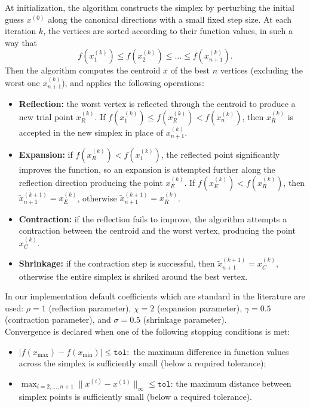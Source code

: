\documentclass[a4paper,12pt]{article}
\begin{document}
	At initialization, the algorithm constructs the simplex by perturbing the initial guess \( x^{(0)} \) along the canonical directions with a small fixed step size. At each iteration $k$, the vertices are sorted according to their function values, in such a way that
	\[
	f(x^{(k)}_{1})\leq f(x^{(k)}_{2})\leq\dots\leq f(x^{(k)}_{n+1}).
	\]
	Then the algorithm computes the centroid \( \bar{x} \) of the best \( n \) vertices (excluding the worst one $x^{(k)}_{n+1}$), and applies the following operations:
	\begin{itemize}
		\item \textbf{Reflection:} the worst vertex is reflected through the centroid to produce a new trial point $x^{(k)}_{R}$. If $f(x^{(k)}_{1})\leq f(x^{(k)}_{R})<f(x^{(k)}_{n})$, then $x^{(k)}_{R}$ is accepted in the new simplex in place of $x^{(k)}_{n+1}$.
		\item \textbf{Expansion:} if $f(x^{(k)}_{R}) < f(x^{(k)}_{1})$, the reflected point significantly improves the function, so an expansion is attempted further along the reflection direction producing the point $x^{(k)}_{E}$. If $f(x^{(k)}_{E}) < f(x^{(k)}_{R})$, then $\tilde{x}^{(k+1)}_{n+1} = x^{(k)}_{E}$, otherwise $\tilde{x}^{(k+1)}_{n+1} = x^{(k)}_{R}$.
		\item \textbf{Contraction:} if the reflection fails to improve, the algorithm attempts a contraction between the centroid and the worst vertex, producing the point $x^{(k)}_{C}$. 
		\item \textbf{Shrinkage:} if the contraction step is successful, then $\tilde{x}^{(k+1)}_{n+1} = x^{(k)}_{C}$, otherwise the entire simplex is shriked around the best vertex.
	\end{itemize}
	
	In our implementation default coefficients which are standard in the literature are used: \(\rho = 1\) (reflection parameter), \(\chi = 2 \) (expansion parameter), \( \gamma = 0.5 \) (contraction parameter), and \( \sigma = 0.5 \) (shrinkage parameter).\\
	
	Convergence is declared when one of the following stopping conditions is met:
	\begin{itemize}
		\item \(
		|f(x_{\max}) - f(x_{\min})| \leq \texttt{tol}:
		\) the maximum difference in function values across the simplex is sufficiently small (below a required tolerance);
		\item \(
		\max_{i=2,\dots,n+1} \|x^{(i)} - x^{(1)}\|_{\infty} \leq \texttt{tol}
		\): the maximum distance between simplex points is sufficiently small (below a required tolerance).
	\end{itemize}
	
\end{document}

